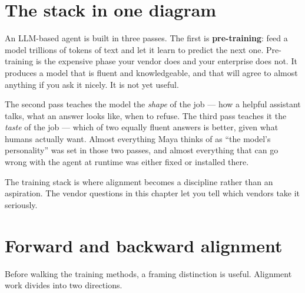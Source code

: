 \label{ch:10-alignment-02-training}

\starttwocol

\section{The stack in one diagram}

An LLM-based agent is built in three passes. The first is \textbf{pre-training}: feed a model trillions of tokens of text and let it learn to predict the next one. Pre-training is the expensive phase your vendor does and your enterprise does not. It produces a model that is fluent and knowledgeable, and that will agree to almost anything if you ask it nicely. It is not yet useful.

The second pass teaches the model the \textit{shape} of the job --- how a helpful assistant talks, what an answer looks like, when to refuse. The third pass teaches it the \textit{taste} of the job --- which of two equally fluent answers is better, given what humans actually want. Almost everything Maya thinks of as ``the model's personality'' was set in those two passes, and almost everything that can go wrong with the agent at runtime was either fixed or installed there.

The training stack is where alignment becomes a discipline rather than an aspiration. The vendor questions in this chapter let you tell which vendors take it seriously.

\section{Forward and backward alignment}

Before walking the training methods, a framing distinction is useful. Alignment work divides into two directions.

